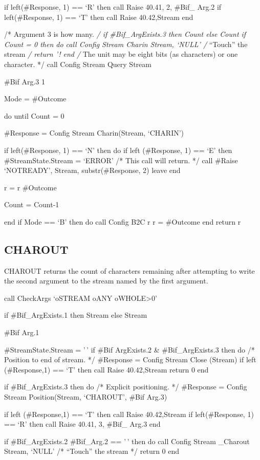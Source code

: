 if left(\#Response, 1) == `R' then call Raise 40.41, 2, \#Bif\_ Arg.2 if
left(\#Response, 1) == `T' then call Raise 40.42,Stream end

/* Argument 3 is how many. \emph{/ if \#Bif\_ArgExists.3 then Count else
Count if Count = 0 then do call Config Stream Charin Stream, `NULL' /}
``Touch'' the stream \emph{/ return '! end /} The unit may be eight bits
(as characters) or one character. */ call Config Stream Query Stream

\#Bif Arg.3 1

Mode = \#Outcome

do until Count = 0

\#Response = Config Stream Charin(Stream, `CHARIN')

if left(\#Response, 1) == `N' then do if left (\#Response, 1) == `E'
then \#StreamState.Stream = `ERROR' /* This call will return. */ call
\#Raise `NOTREADY', Stream, substr(\#Response, 2) leave end

r = r\textbar{} \textbar\#Outcome

Count = Count-1

end if Mode == `B' then do call Config B2C r r = \#Outcome end return r

\subsection{CHAROUT}\label{charout}

CHAROUT returns the count of characters remaining after attempting to
write the second argument to the stream named by the first argument.

call CheckArgs `oSTREAM oANY oWHOLE\textgreater0'

if \#Bif\_ArgExists.1 then Stream else Stream

\#Bif Arg.1

\#StreamState.Stream = '\,' if \#Bif ArgExists.2 \& \#Bif\_ArgExists.3
then do /* Position to end of stream. */ \#Response = Config Stream
Close (Stream) if left (\#Response,1) == `T' then call Raise
40.42,Stream return 0 end

if \#Bif\_ArgExists.3 then do /* Explicit positioning. */ \#Response =
Config Stream Position(Stream, `CHAROUT', \#Bif Arg.3)

if left (\#Response,1) == `T' then call Raise 40.42,Stream if
left(\#Response, 1) == `R' then call Raise 40.41, 3, \#Bif\_ Arg.3 end

if \#Bif\_ArgExists.2 \textbar{} \#Bif\_Arg.2 == '\,' then do call
Config Stream \_Charout Stream, `NULL' /* ``Touch'' the stream */ return
0 end

